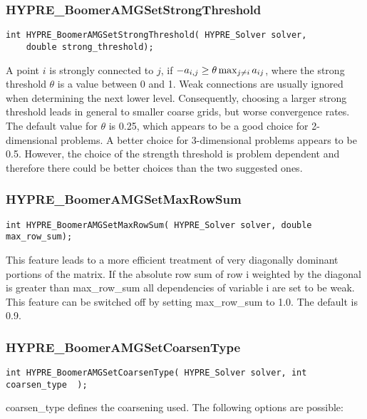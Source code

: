 \subsubsection*{HYPRE\_BoomerAMGSetStrongThreshold}
\begin{display}
\begin{verbatim}
int HYPRE_BoomerAMGSetStrongThreshold( HYPRE_Solver solver,
	double strong_threshold);
\end{verbatim}
\end{display}
A point $i$ is strongly connected to $j$, if $-a_{i,j} \geq \theta 
\max_{j \neq i} \-a_{ij}$, where the strong threshold $\theta$ is a value
between 0 and 1. Weak connections are usually ignored when determining
the next lower level. Consequently, choosing a larger strong threshold
leads in general to smaller coarse grids, but worse convergence rates.
The default value for $\theta$
is 0.25, which appears to be a good choice for 2-dimensional
problems. A better choice for 3-dimensional problems appears to be 0.5. However,
the choice of the strength threshold is problem dependent and therefore
there could be better choices than the two suggested ones.

\subsubsection*{HYPRE\_BoomerAMGSetMaxRowSum}
\begin{display}
\begin{verbatim}
int HYPRE_BoomerAMGSetMaxRowSum( HYPRE_Solver solver, double max_row_sum);
\end{verbatim}
\end{display}
This feature leads to a more efficient treatment of very
diagonally dominant portions of the matrix.
If the absolute row sum of row i weighted by the diagonal
is greater than max\_row\_sum all dependencies of variable i are set
to be weak. 
This feature can be switched off by setting max\_row\_sum to 1.0.
The default is 0.9.

\subsubsection*{HYPRE\_BoomerAMGSetCoarsenType}
\begin{display}
\begin{verbatim}
int HYPRE_BoomerAMGSetCoarsenType( HYPRE_Solver solver, int coarsen_type  );
\end{verbatim}
\end{display}
coarsen\_type defines the coarsening used. The following options 
are possible:

